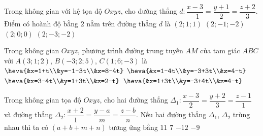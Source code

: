 \begin{ex}%
Trong không gian với hệ tọa độ $Oxyz$, cho đường thẳng $d\colon \dfrac{x-3}{-1}=\dfrac{y+1}{2}=\dfrac{z+2}{3}$. Điểm có hoành độ bằng $2$ nằm trên đường thẳng $d$ là
\choice
{\True $\left(2;1;1\right)$}
{$\left(2;-1;-2\right)$}
{$\left(2;0;0\right)$}
{$\left(2;-3;-2\right)$}

\end{ex}

\begin{ex}%
Trong không gian $Oxyz$, phương trình đường trung tuyến $AM$ của tam giác $ABC$ với $A(3;1;2)$, $B(-3;2;5)$, $C(1;6;-3)$ là
\choice
{$\heva{&x=1+t\\&y=-1-3t\\&z=8-4t}$}
{$\heva{&x=1-4t\\&y=-3+3t\\&z=4-t}$}
{\True $\heva{&x=3-4t\\&y=1+3t\\&z=2-t}$}
{$\heva{&x=1+3t\\&y=-3+4t\\&z=4-t}$}
\end{ex}

\begin{ex}%
Trong không gian tọa độ $Oxyz$, cho hai đường thẳng $\Delta_1\colon \dfrac{x-3}{2}=\dfrac{y+2}{3}=\dfrac{z-1}{1}$ và đường thẳng $\Delta_2\colon \dfrac{x+2}{1}=\dfrac{y-a}{m}=\dfrac{z-b}{n}$. Nếu hai đường thẳng $\Delta_1$, $\Delta_2$ trùng nhau thì ta có $(a+b+m+n)$ tương ứng bằng
\choice
{$11$}
{$7$}
{$-12$}
{\True $-9$}
\end{ex}

